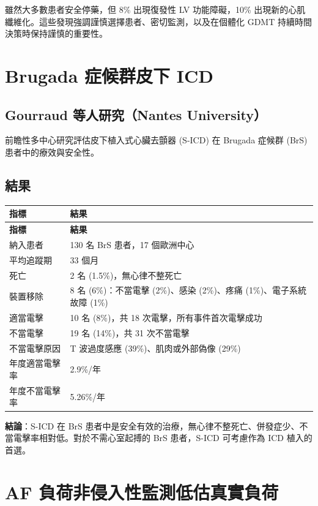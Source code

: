 \documentclass[12pt,a4paper]{article}
\newcommand{\note}[1]{
    \par
    \noindent
    \begin{tcolorbox}[
        colback=emergency_blue!5!white,
        colframe=emergency_blue,
        title=\textbf{重點提醒},
        fonttitle=\bfseries,
        boxrule=0.5pt,
        arc=3pt,
        left=6pt,
        right=6pt,
        top=6pt,
        bottom=6pt
    ]
    #1
    \end{tcolorbox}
}
\begin{document}
\note{
雖然大多數患者安全停藥，但 8\% 出現復發性 LV 功能障礙，10\% 出現新的心肌纖維化。這些發現強調謹慎選擇患者、密切監測，以及在個體化 GDMT 持續時間決策時保持謹慎的重要性。
}

\section{Brugada 症候群皮下 ICD}

\subsection{Gourraud 等人研究（Nantes University）}

前瞻性多中心研究評估皮下植入式心臟去顫器 (S-ICD) 在 Brugada 症候群 (BrS) 患者中的療效與安全性。

\subsection{結果}

\begin{longtable}{p{6cm}p{8cm}}
\toprule
\textbf{指標} & \textbf{結果} \\
\midrule
\endfirsthead
\toprule
\textbf{指標} & \textbf{結果} \\
\midrule
\endhead
納入患者 & 130 名 BrS 患者，17 個歐洲中心 \\
\midrule
平均追蹤期 & 33 個月 \\
\midrule
死亡 & 2 名 (1.5\%)，無心律不整死亡 \\
\midrule
裝置移除 & 8 名 (6\%)：不當電擊 (2\%)、感染 (2\%)、疼痛 (1\%)、電子系統故障 (1\%) \\
\midrule
適當電擊 & 10 名 (8\%)，共 18 次電擊，所有事件首次電擊成功 \\
\midrule
不當電擊 & 19 名 (14\%)，共 31 次不當電擊 \\
\midrule
不當電擊原因 & T 波過度感應 (39\%)、肌肉或外部偽像 (29\%) \\
\midrule
年度適當電擊率 & 2.9\%/年 \\
\midrule
年度不當電擊率 & 5.26\%/年 \\
\bottomrule
\end{longtable}

\textbf{結論}：S-ICD 在 BrS 患者中是安全有效的治療，無心律不整死亡、併發症少、不當電擊率相對低。對於不需心室起搏的 BrS 患者，S-ICD 可考慮作為 ICD 植入的首選。

\section{AF 負荷非侵入性監測低估真實負荷}
\end{document}
